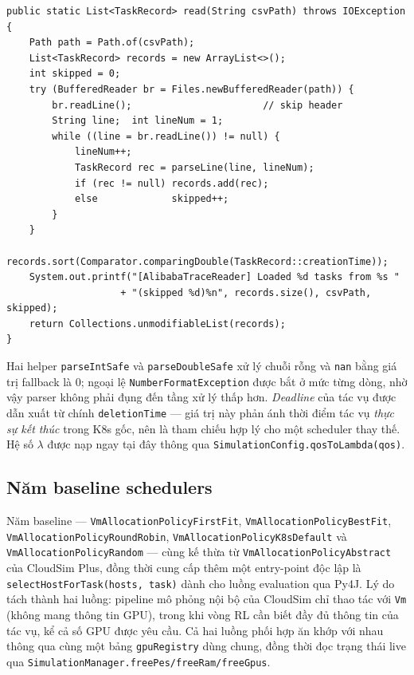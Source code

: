 \begin{lstlisting}[style=javastyle, caption={\texttt{AlibabaTraceReader.read()}
-- tolerant CSV parsing.}, label={lst:trace-read}]
public static List<TaskRecord> read(String csvPath) throws IOException {
    Path path = Path.of(csvPath);
    List<TaskRecord> records = new ArrayList<>();
    int skipped = 0;
    try (BufferedReader br = Files.newBufferedReader(path)) {
        br.readLine();                       // skip header
        String line;  int lineNum = 1;
        while ((line = br.readLine()) != null) {
            lineNum++;
            TaskRecord rec = parseLine(line, lineNum);
            if (rec != null) records.add(rec);
            else             skipped++;
        }
    }
    records.sort(Comparator.comparingDouble(TaskRecord::creationTime));
    System.out.printf("[AlibabaTraceReader] Loaded %d tasks from %s "
                    + "(skipped %d)%n", records.size(), csvPath, skipped);
    return Collections.unmodifiableList(records);
}
\end{lstlisting}

Hai helper \texttt{parseIntSafe} và \texttt{parseDoubleSafe} xử lý
chuỗi rỗng và \texttt{nan} bằng giá trị fallback là $0$; ngoại lệ
\texttt{NumberFormatException} được bắt ở mức từng dòng, nhờ vậy
parser không phải đụng đến tầng xử lý thấp hơn. \emph{Deadline} của
tác vụ được dẫn xuất từ chính \texttt{deletionTime} --- giá trị này
phản ánh thời điểm tác vụ \emph{thực sự kết thúc} trong K8s gốc, nên
là tham chiếu hợp lý cho một scheduler thay thế. Hệ số $\lambda$ được
nạp ngay tại đây thông qua \texttt{SimulationConfig.qosToLambda(qos)}.

\subsection{Năm baseline schedulers}
\label{ssec:impl-baselines}

Năm baseline --- \texttt{VmAllocationPolicyFirstFit},
\texttt{VmAllocationPolicyBestFit},
\texttt{VmAllocationPolicyRoundRobin},
\texttt{VmAllocationPolicyK8sDefault} và
\texttt{VmAllocationPolicyRandom} --- cùng kế thừa từ
\texttt{VmAllocationPolicyAbstract} của CloudSim Plus, đồng thời cung
cấp thêm một entry-point độc lập là
\texttt{selectHostForTask(hosts, task)} dành cho luồng evaluation qua
Py4J. Lý do tách thành hai luồng: pipeline mô phỏng nội bộ của
CloudSim chỉ thao tác với \texttt{Vm} (không mang thông tin GPU),
trong khi vòng RL cần biết đầy đủ thông tin của tác vụ, kể cả số GPU
được yêu cầu. Cả hai luồng phối hợp ăn khớp với nhau thông qua cùng
một bảng \texttt{gpuRegistry} dùng chung, đồng thời đọc trạng thái
live qua \texttt{SimulationManager.freePes/freeRam/freeGpus}.

